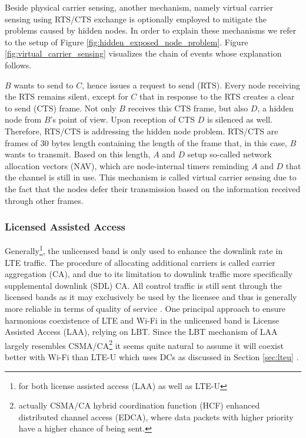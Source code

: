Beside physical carrier sensing, another mechanism, namely virtual carrier sensing using RTS/CTS exchange is optionally employed to mitigate the problems caused by hidden nodes. In order to explain these mechanisms we refer to the setup of Figure \ref{fig:hidden_exposed_node_problem}. Figure \ref{fig:virtual_carrier_sensing} visualizes the chain of events whose explanation follows.

$B$ wants to send to $C$, hence issues a request to send (RTS). Every node receiving the RTS remains silent, except for $C$ that in response to the RTS creates a clear to send (CTS) frame. Not only $B$ receives this CTS frame, but also $D$, a hidden node from $B$'s point of view. Upon reception of CTS $D$ is silenced as well. Therefore, RTS/CTS is addressing the hidden node problem. RTS/CTS are frames of 30 bytes length containing the length of the frame that, in this case, $B$ wants to transmit. Based on this length, $A$ and $D$ setup so-called network allocation vectors (NAV), which are node-internal timers reminding $A$ and $D$ that the channel is still in use. This mechanism is called virtual carrier sensing due to the fact that the nodes defer their transmission based on the information received through other frames.

\subsubsection{Licensed Assisted Access}
Generally\footnote{for both license assisted access (LAA) as well as LTE-U}, the unlicensed band is only used to enhance the downlink rate in LTE traffic. The procedure of allocating additional carriers is called carrier aggregation (CA), and due to its limitation to downlink traffic more specifically supplemental downlink (SDL) CA. All control traffic is still sent through the licensed bands as it may exclusively be used by the licensee and thus is generally more reliable in terms of quality of service \cite{qualcomm15}.
One principal approach to ensure harmonious coexistence of LTE and Wi-Fi in the unlicensed band is License Assisted Access (LAA), relying on LBT. Since the LBT mechanism of LAA largely resembles CSMA/CA\footnote{actually CSMA/CA hybrid coordination function (HCF) enhanced distributed channel access (EDCA), where data packets with higher priority have a higher chance of being sent.} it seems quite natural to assume it will coexist better with Wi-Fi than LTE-U which uses DCs as discussed in Section \ref{sec:lteu} \cite{kwon17}.

